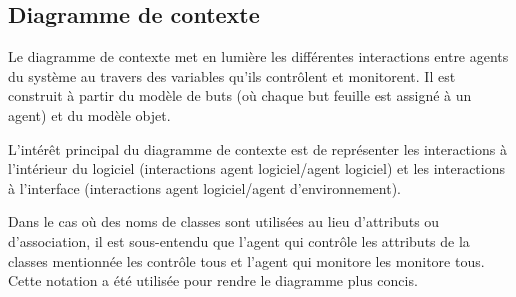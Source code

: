 \subsection{Diagramme de contexte}

	Le diagramme de contexte met en lumière les différentes interactions entre 
	agents du système au travers des variables qu'ils contrôlent et monitorent. 
	Il est construit à partir du modèle de buts (où chaque but feuille est 
	assigné à un agent) et du modèle objet.
	
	
	L'intérêt principal du diagramme de contexte est de représenter les interactions
	à l'intérieur du logiciel (interactions agent logiciel/agent logiciel) et
	les interactions à l'interface (interactions agent logiciel/agent
	d'environnement).
	
	Dans le cas où des noms de classes sont utilisées au lieu d'attributs ou d'association, il est sous-entendu que l'agent qui contrôle les attributs de la classes mentionnée les contrôle tous et l'agent qui monitore les monitore tous.  Cette notation a été utilisée pour rendre le diagramme plus concis.
	
